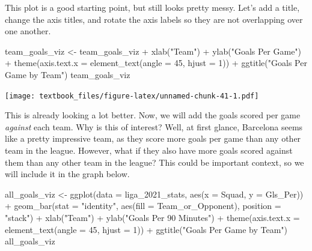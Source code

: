 \documentclass[
  11pt,
]{book}
\newenvironment{Shaded}{\begin{snugshade}}{\end{snugshade}}
\newcommand{\AttributeTok}[1]{\textcolor[rgb]{0.77,0.63,0.00}{#1}}
\newcommand{\DecValTok}[1]{\textcolor[rgb]{0.00,0.00,0.81}{#1}}
\newcommand{\FunctionTok}[1]{\textcolor[rgb]{0.00,0.00,0.00}{#1}}
\newcommand{\NormalTok}[1]{#1}
\newcommand{\OtherTok}[1]{\textcolor[rgb]{0.56,0.35,0.01}{#1}}
\newcommand{\SpecialCharTok}[1]{\textcolor[rgb]{0.00,0.00,0.00}{#1}}
\newcommand{\StringTok}[1]{\textcolor[rgb]{0.31,0.60,0.02}{#1}}
\theoremstyle{definition}
\theoremstyle{definition}
\theoremstyle{definition}
\theoremstyle{definition}
\theoremstyle{remark}
\begin{document}
This plot is a good starting point, but still looks pretty messy. Let's add a title, change the axis titles, and rotate the axis labels so they are not overlapping over one another.

\begin{Shaded}
\begin{Highlighting}[]
\NormalTok{team\_goals\_viz }\OtherTok{\textless{}{-}}\NormalTok{ team\_goals\_viz }\SpecialCharTok{+}
  \FunctionTok{xlab}\NormalTok{(}\StringTok{"Team"}\NormalTok{) }\SpecialCharTok{+}
  \FunctionTok{ylab}\NormalTok{(}\StringTok{"Goals Per Game"}\NormalTok{) }\SpecialCharTok{+}
  \FunctionTok{theme}\NormalTok{(}\AttributeTok{axis.text.x =} \FunctionTok{element\_text}\NormalTok{(}\AttributeTok{angle =} \DecValTok{45}\NormalTok{, }\AttributeTok{hjust =} \DecValTok{1}\NormalTok{)) }\SpecialCharTok{+}
  \FunctionTok{ggtitle}\NormalTok{(}\StringTok{"Goals Per Game by Team"}\NormalTok{)}
\NormalTok{team\_goals\_viz}
\end{Highlighting}
\end{Shaded}

\texttt{[image: textbook\_files/figure-latex/unnamed-chunk-41-1.pdf]}

\newpage

This is already looking a lot better. Now, we will add the goals scored per game \emph{against} each team. Why is this of interest? Well, at first glance, Barcelona seems like a pretty impressive team, as they score more goals per game than any other team in the league. However, what if they also have more goals scored against them than any other team in the league? This could be important context, so we will include it in the graph below.

\begin{Shaded}
\begin{Highlighting}[]
\NormalTok{all\_goals\_viz }\OtherTok{\textless{}{-}} \FunctionTok{ggplot}\NormalTok{(}\AttributeTok{data =}\NormalTok{ liga\_2021\_stats, }\FunctionTok{aes}\NormalTok{(}\AttributeTok{x =}\NormalTok{ Squad, }\AttributeTok{y =}\NormalTok{ Gls\_Per)) }\SpecialCharTok{+}
  \FunctionTok{geom\_bar}\NormalTok{(}\AttributeTok{stat =} \StringTok{"identity"}\NormalTok{, }\FunctionTok{aes}\NormalTok{(}\AttributeTok{fill =}\NormalTok{ Team\_or\_Opponent), }\AttributeTok{position =} \StringTok{"stack"}\NormalTok{) }\SpecialCharTok{+}
  \FunctionTok{xlab}\NormalTok{(}\StringTok{"Team"}\NormalTok{) }\SpecialCharTok{+}
  \FunctionTok{ylab}\NormalTok{(}\StringTok{"Goals Per 90 Minutes"}\NormalTok{) }\SpecialCharTok{+}
  \FunctionTok{theme}\NormalTok{(}\AttributeTok{axis.text.x =} \FunctionTok{element\_text}\NormalTok{(}\AttributeTok{angle =} \DecValTok{45}\NormalTok{, }\AttributeTok{hjust =} \DecValTok{1}\NormalTok{)) }\SpecialCharTok{+}
  \FunctionTok{ggtitle}\NormalTok{(}\StringTok{"Goals Per Game by Team"}\NormalTok{)}
\NormalTok{all\_goals\_viz}
\end{Highlighting}
\end{Shaded}
\end{document}
